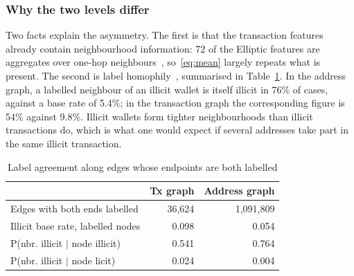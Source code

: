 \subsubsection{Why the two levels differ} Two facts explain the asymmetry. The first is that the transaction features already contain neighbourhood information: 72 of the Elliptic features are aggregates over one-hop neighbours~\cite{weber2019}, so~\eqref{eq:mean} largely repeats what is present. The second is label homophily~\cite{mcpherson2001}, summarised in Table~\ref{tab:homophily}. In the address graph, a labelled neighbour of an illicit wallet is itself illicit in 76\% of cases, against a base rate of 5.4\%; in the transaction graph the corresponding figure is 54\% against 9.8\%. Illicit wallets form tighter neighbourhoods than illicit transactions do, which is what one would expect if several addresses take part in the same illicit transaction.

\begin{table}[t]
\caption{Label agreement along edges whose endpoints are both labelled}\label{tab:homophily}
\centering
\setlength{\tabcolsep}{3pt}
\begin{tabular}{lrr}
\toprule
 & Tx graph & Address graph \\
\midrule
Edges with both ends labelled & 36,624 & 1,091,809 \\
Illicit base rate, labelled nodes & 0.098 & 0.054 \\
P(nbr. illicit $|$ node illicit) & 0.541 & 0.764 \\
P(nbr. illicit $|$ node licit) & 0.024 & 0.004 \\
\bottomrule
\end{tabular}
\end{table}


